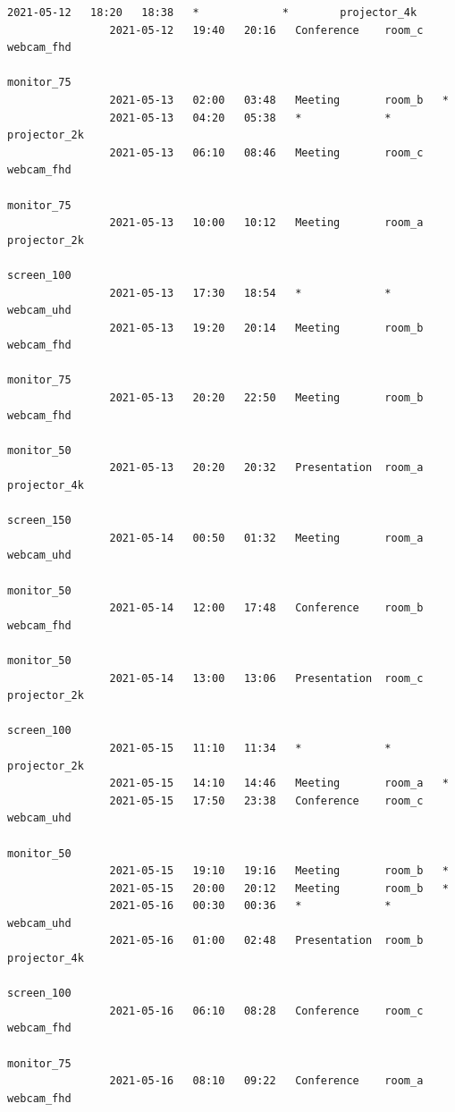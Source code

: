 \documentclass{article}
\begin{document}
\begin{Verbatim}[gobble=8]
                2021-05-12   18:20   18:38   *             *        projector_4k
                2021-05-12   19:40   20:16   Conference    room_c   webcam_fhd
                                                                    monitor_75
                2021-05-13   02:00   03:48   Meeting       room_b   *
                2021-05-13   04:20   05:38   *             *        projector_2k
                2021-05-13   06:10   08:46   Meeting       room_c   webcam_fhd
                                                                    monitor_75
                2021-05-13   10:00   10:12   Meeting       room_a   projector_2k
                                                                    screen_100
                2021-05-13   17:30   18:54   *             *        webcam_uhd
                2021-05-13   19:20   20:14   Meeting       room_b   webcam_fhd
                                                                    monitor_75
                2021-05-13   20:20   22:50   Meeting       room_b   webcam_fhd
                                                                    monitor_50
                2021-05-13   20:20   20:32   Presentation  room_a   projector_4k
                                                                    screen_150
                2021-05-14   00:50   01:32   Meeting       room_a   webcam_uhd
                                                                    monitor_50
                2021-05-14   12:00   17:48   Conference    room_b   webcam_fhd
                                                                    monitor_50
                2021-05-14   13:00   13:06   Presentation  room_c   projector_2k
                                                                    screen_100
                2021-05-15   11:10   11:34   *             *        projector_2k
                2021-05-15   14:10   14:46   Meeting       room_a   *
                2021-05-15   17:50   23:38   Conference    room_c   webcam_uhd
                                                                    monitor_50
                2021-05-15   19:10   19:16   Meeting       room_b   *
                2021-05-15   20:00   20:12   Meeting       room_b   *
                2021-05-16   00:30   00:36   *             *        webcam_uhd
                2021-05-16   01:00   02:48   Presentation  room_b   projector_4k
                                                                    screen_100
                2021-05-16   06:10   08:28   Conference    room_c   webcam_fhd
                                                                    monitor_75
                2021-05-16   08:10   09:22   Conference    room_a   webcam_fhd

\end{Verbatim}
\end{document}
